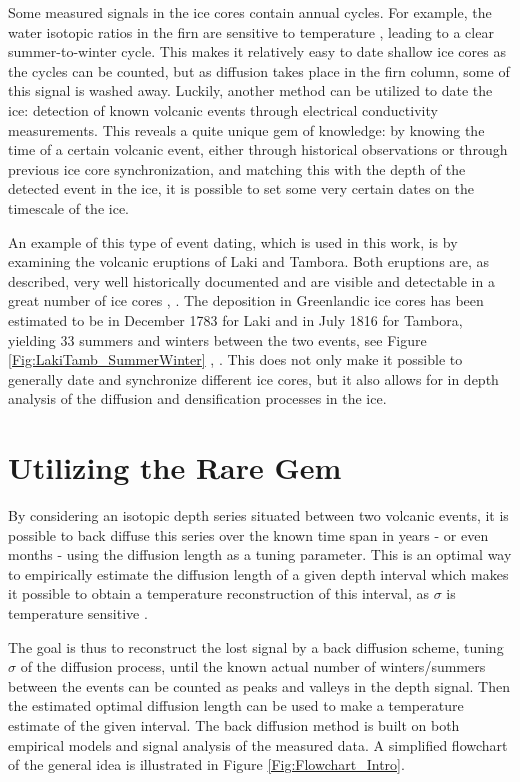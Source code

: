 \documentclass[../../CompleteThesis2/Complete_2ndDraft]{subfiles}
\begin{document}
Some measured signals in the ice cores contain annual cycles. For example, the water isotopic ratios in the firn are sensitive to temperature \cite[J. Jouzel, 1997]{Jouzel1997}, leading to a clear summer-to-winter cycle. This makes it relatively easy to date shallow ice cores as the cycles can be counted, but as diffusion takes place in the firn column, some of this signal is washed away. Luckily, another method can be utilized to date the ice: detection of known volcanic events through electrical conductivity measurements. This reveals a quite unique gem of knowledge: by knowing the time of a certain volcanic event, either through historical observations or through previous ice core synchronization, and matching this with the depth of the detected event in the ice, it is possible to set some very certain dates on the timescale of the ice. 

An example of this type of event dating, which is used in this work, is by examining the volcanic eruptions of Laki and Tambora. Both eruptions are, as described, very well historically documented and are visible and detectable in a great number of ice cores \cite[H. Clausen, 1988]{Clausen1988a}, \cite[C. Langway, 1988]{Langway1988}. The deposition in Greenlandic ice cores has been estimated to be in December 1783 for Laki and in July 1816 for Tambora, yielding 33 summers and winters between the two events, see Figure \ref{Fig:LakiTamb_SummerWinter} \cite[J. Cole-Dai et al., 2009]{Dai2009}, \cite[L. Wei, 2008]{Wei2008}. This does not only make it possible to generally date and synchronize different ice cores, but it also allows for in depth analysis of the diffusion and densification processes in the ice.
	

	
	
\section[Using the Rare Gem]{Utilizing the Rare Gem}
\label{Sec:UtilizinGem}
By considering an isotopic depth series situated between two volcanic events, it is possible to back diffuse this series over the known time span in years - or even months - using the diffusion length as a tuning parameter. This is an optimal way to empirically estimate the diffusion length of a given depth interval which makes it possible to obtain a temperature reconstruction of this interval, as $\sigma$ is temperature sensitive \cite{Holme2018}.

The goal is thus to reconstruct the lost signal by a back diffusion scheme, tuning $\sigma$ of the diffusion process, until the known actual number of winters/summers between the events can be counted as peaks and valleys in the depth signal. Then the estimated optimal diffusion length can be used to make a temperature estimate of the given interval.
The back diffusion method is built on both empirical models and signal analysis of the measured data. A simplified flowchart of the general idea is illustrated in Figure \ref{Fig:Flowchart_Intro}.
\end{document}
